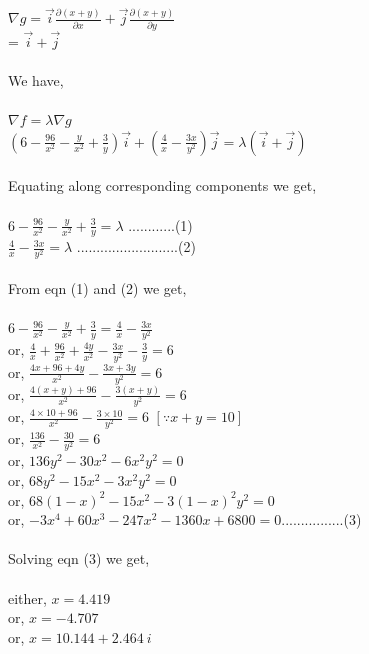 $\nabla g = \Vec{i}\frac{\partial{(x + y)}}{\partial {x}} + \Vec{j}\frac{\partial{(x + y)}}{\partial {y}}$\\
\hspace*{5 mm} = $ \Vec{i} + \Vec{j}$\\\\
We have,\\\\
$ \nabla f = \lambda \nabla g $\\
$\left( 6 - \frac{96}{x^2} - \frac{y}{x^2} + \frac{3}{y} \right) \Vec{i} + \left( \frac{4}{x} - \frac{3x}{y^2} \right) \Vec{j} = \lambda (\Vec{i} + \Vec{j}) $\\\\
Equating along corresponding components we get,\\\\
$ 6 - \frac{96}{x^2} - \frac{y}{x^2} + \frac{3}{y} = \lambda $ 
............(1)\\
$ \frac{4}{x} - \frac{3x}{y^2} = \lambda $ ..........................(2)\\\\
From eqn (1) and (2) we get,\\\\
$ 6 - \frac{96}{x^2} - \frac{y}{x^2} + \frac{3}{y} = \frac{4}{x} - \frac{3x}{y^2} $\\
or, $ \frac{4}{x} + \frac{96}{x^2} + \frac{4y}{x^2} - \frac{3x}{y^2} - \frac{3}{y} = 6$\\
or, $ \frac{4x + 96 + 4y}{x^2} - \frac{3x + 3y}{y^2} = 6$\\
or, $ \frac{4(x+y) + 96}{x^2} - \frac{3(x+y)}{y^2} = 6$\\
or, $ \frac{4 \times 10 + 96}{x^2} - \frac{3 \times 10}{y^2} = 6$ $ [\because x + y = 10]$\\
or, $ \frac{136}{x^2} - \frac{30}{y^2} = 6$\\
or, $ 136y^2 - 30x^2 - 6x^2y^2 = 0$\\
or, $ 68y^2 - 15x^2 - 3x^2y^2 = 0$\\
or, $ 68(1-x)^2 - 15x^2 - 3(1-x)^2y^2 = 0$\\
or, $ -3x^4 + 60x^3 - 247x^2 -1360x + 6800 = 0$................(3)\\\\
Solving eqn (3) we get,\\\\
either, $ x = 4.419$\\
or, $ x = -4.707$\\
or, $ x = 10.144 + 2.464\: i$\\
